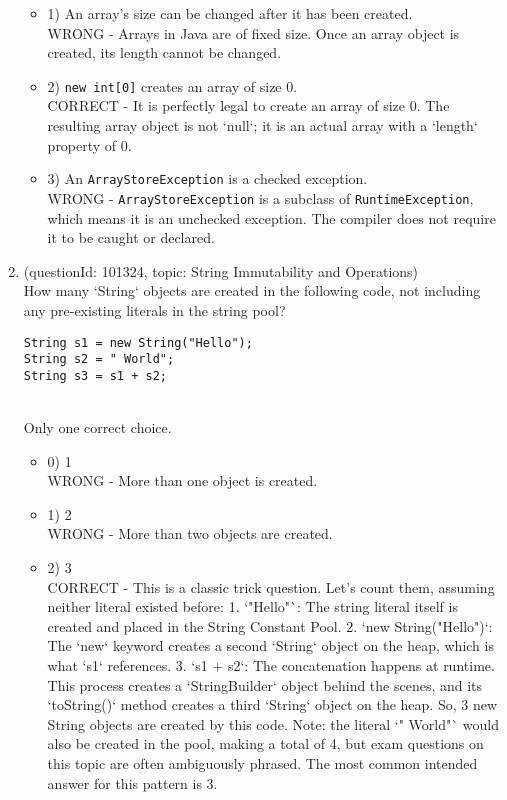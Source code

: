 \documentclass[12pt]{article}
\begin{document}
\begin{enumerate}[label=(\arabic*)]
\begin{itemize}
\item 1) An array's size can be changed after it has been created.
 \\ 
WRONG - Arrays in Java are of fixed size. Once an array object is created, its length cannot be changed.

\item 2) \verb|new int[0]| creates an array of size 0.
 \\ 
CORRECT - It is perfectly legal to create an array of size 0. The resulting array object is not `null`; it is an actual array with a `length` property of 0.

\item 3) An \verb|ArrayStoreException| is a checked exception.
 \\ 
WRONG - \verb|ArrayStoreException| is a subclass of \verb|RuntimeException|, which means it is an unchecked exception. The compiler does not require it to be caught or declared.

\end{itemize}
\item (questionId: 101324, topic: String Immutability and Operations) \\ 
How many `String` objects are created in the following code, not including any pre-existing literals in the string pool?
\begin{verbatim}
String s1 = new String("Hello");
String s2 = " World";
String s3 = s1 + s2;
\end{verbatim}
\\ \noindent Only one correct choice. 
\begin{itemize}
\item 0) 1
 \\ 
WRONG - More than one object is created.

\item 1) 2
 \\ 
WRONG - More than two objects are created.

\item 2) 3
 \\ 
CORRECT - This is a classic trick question. Let's count them, assuming neither literal existed before: 1. `"Hello"`: The string literal itself is created and placed in the String Constant Pool. 2. `new String("Hello")`: The `new` keyword creates a second `String` object on the heap, which is what `s1` references. 3. `s1 + s2`: The concatenation happens at runtime. This process creates a `StringBuilder` object behind the scenes, and its `toString()` method creates a third `String` object on the heap. So, 3 new String objects are created by this code. Note: the literal `" World"` would also be created in the pool, making a total of 4, but exam questions on this topic are often ambiguously phrased. The most common intended answer for this pattern is 3.


\end{itemize}
\end{enumerate}
\end{document}
